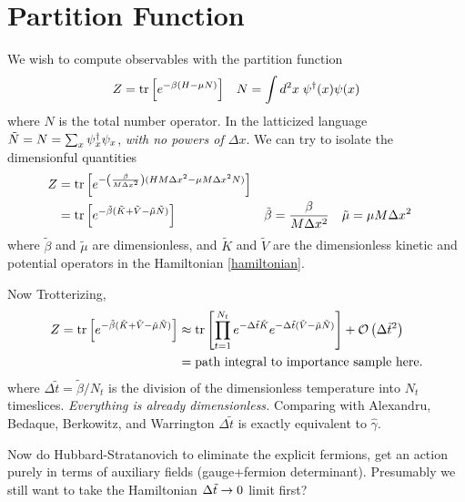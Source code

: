 \section{Partition Function}

We wish to compute observables with the partition function
\begin{align}
	Z
	&=
	\text{tr}\left[e^{-\beta(H-\mu N)}\right]
	&
	N = \int d^2x\; \psi{}^{\dagger}(x)\psi(x)
\end{align}
where $N$ is the total number operator.
In the latticized language $\tilde{N}=N=\sum_x \psi{}^{\dagger}_x \psi_x$, \emph{with no powers of $\Delta x$}.
We can try to isolate the dimensionful quantities
\begin{align}
	Z
	&=
	\text{tr}\left[e^{-\left(\frac{\beta}{M\Delta x^2}\right)(HM\Delta x^2 -\mu M \Delta x^2 N)}\right]
\\
	&=
	\text{tr}\left[e^{-\tilde{\beta}(\tilde{K}+\tilde{V}-\tilde{\mu} \tilde{N})}\right]
	&
	\tilde{\beta} &= \frac{\beta}{M \Delta x^2}
	&
	\tilde{\mu}   &= \mu M \Delta x^2
\end{align}
where $\tilde{\beta}$ and $\tilde{\mu}$ are dimensionless, and $\tilde{K}$ and $\tilde{V}$ are the dimensionless kinetic and potential operators in the Hamiltonian \eqref{hamiltonian}.

Now Trotterizing,
\begin{align}
	Z
	=
	\text{tr}\left[e^{-\tilde{\beta}(\tilde{K}+\tilde{V}-\tilde{\mu} \tilde{N})}\right]
	&\approx
	\text{tr}\left[\prod_{t=1}^{N_t} e^{-\Delta \tilde{t} \tilde{K}} e^{-\Delta\tilde{t}(\tilde{V}-\tilde{\mu}\tilde{N})}\right] + \mathcal{O}\left(\Delta\tilde{t}^2\right)
	\\
	&=
	\textrm{path integral to importance sample here.}
\end{align}
where $\Delta\tilde{t} = \tilde{\beta}/N_t$ is the division of the dimensionless temperature into $N_t$ timeslices.
\emph{Everything is already dimensionless.}
Comparing with Alexandru, Bedaque, Berkowitz, and Warrington $\Delta\tilde{t}$ is exactly equivalent to $\hat{\gamma}$.

Now do Hubbard-Stratanovich to eliminate the explicit fermions, get an action purely in terms of auxiliary fields (gauge+fermion determinant).
Presumably we still want to take the Hamiltonian $\Delta\tilde{t}\rightarrow0$ limit first?
